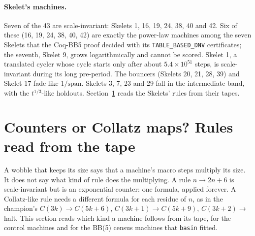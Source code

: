 \documentclass[11pt,a4paper]{article}
\newcommand{\BB}[1]{BB(#1)}
\begin{document}
\paragraph{Skelet's machines.} Seven of the 43 are scale-invariant: Skelets 1, 16, 19, 24, 38, 40
and 42. Six of these (16, 19, 24, 38, 40, 42) are exactly the power-law machines among the seven
Skelets that the Coq-BB5 proof decided with its \texttt{TABLE\_BASED\_DNV} certificates; the
seventh, Skelet 9, grows logarithmically and cannot be scored. Skelet 1, a translated cycler whose
cycle starts only after about $5.4\times10^{51}$ steps, is scale-invariant during its long
pre-period. The bouncers (Skelets 20, 21, 28, 39) and Skelet 17 fade like $1/\mathrm{span}$.
Skelets 3, 7, 23 and 29 fall in the intermediate band, with the $t^{1/3}$-like holdouts.
Section~\ref{sec:rulecheck} reads the Skelets' rules from their tapes.


\section{Counters or Collatz maps? Rules read from the tape}
\label{sec:rulecheck}

A wobble that keeps its size says that a machine's macro steps multiply its size. It does not say
what kind of rule does the multiplying. A rule $n \to 2n + 6$ is scale-invariant but is an
exponential counter: one formula, applied forever. A Collatz-like rule needs a different formula
for each residue of $n$, as in the champion's $C(3k) \to C(5k+6)$, $C(3k+1) \to C(5k+9)$,
$C(3k+2) \to$ halt. This section reads which kind a machine follows from its tape, for the control
machines and for the \BB{5} census machines that \texttt{basin} fitted.
\end{document}

